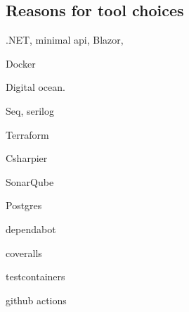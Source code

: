 \subsection{Reasons for tool choices}

.NET, minimal api, Blazor,

Docker

Digital ocean.

Seq, serilog

Terraform

Csharpier

SonarQube

Postgres

dependabot

coveralls

testcontainers

github actions